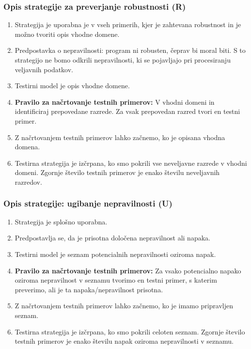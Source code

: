 \documentclass[a4paper,12pt]{article}
\begin{document}
		\subsubsection{Opis strategije za preverjanje robustnosti (R)}
				
			\begin{enumerate}
				\item Strategija je uporabna je v vseh primerih, kjer je zahtevana robustnost in je možno tvoriti opis vhodne domene.
				\item Predpostavka o nepravilnosti: program ni robusten, čeprav bi moral biti. 
					  S to strategijo ne bomo odkrili nepravilnosti, ki se pojavljajo pri procesiranju veljavnih podatkov.
				\item Testirni model je opis vhodne domene.
				\item \textbf{Pravilo za načrtovanje testnih primerov:} V vhodni domeni in identificiraj 
					  prepovedane razrede. Za vsak prepovedan razred tvori en testni primer.
				\item Z načrtovanjem testnih primerov lahko začnemo, ko je opisana vhodna domena.
				\item Testirna strategija je izčrpana, ko smo pokrili vse neveljavne razrede v vhodni 
					  domeni. Zgornje število testnih primerov je enako številu neveljavnih razredov.	
			\end{enumerate}


		\subsubsection{Opis strategije: ugibanje nepravilnosti (U)}
				
			\begin{enumerate}
					\item Strategija je splošno uporabna.
					\item Predpostavlja se, da je prisotna določena nepravilnost ali napaka.
					\item Testirni model je seznam potencialnih nepravilnosti oziroma napak.
					\item \textbf{Pravilo za načrtovanje testnih primerov:} Za vsako potencialno napako 
						  oziroma nepravilnost v seznamu tvorimo en testni primer, s katerim preverimo, 
						  ali je ta napaka/nepravilnost prisotna.
					\item Z načrtovanjem testnih primerov lahko začnemo, ko je imamo pripravljen seznam.
					\item Testirna strategija je izčrpana, ko smo pokrili celoten seznam. Zgornje število 
						  testnih primerov je enako številu napak oziroma nepravilnosti v seznamu.	
			\end{enumerate}
\end{document}
